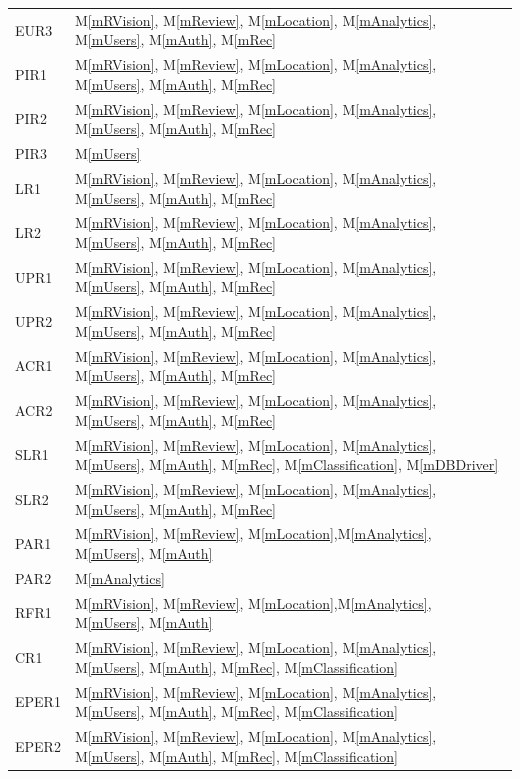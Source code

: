 \documentclass[12pt, titlepage]{article}
\newcommand{\mref}[1]{M\ref{#1}}
\begin{document}
\begin{longtable}{p{} p{}}
EUR3 & \mref{mRVision}, \mref{mReview}, \mref{mLocation}, \mref{mAnalytics}, \mref{mUsers}, \mref{mAuth}, \mref{mRec}\\
PIR1 & \mref{mRVision}, \mref{mReview}, \mref{mLocation}, \mref{mAnalytics}, \mref{mUsers}, \mref{mAuth}, \mref{mRec}\\
PIR2 & \mref{mRVision}, \mref{mReview}, \mref{mLocation}, \mref{mAnalytics}, \mref{mUsers}, \mref{mAuth}, \mref{mRec}\\
PIR3 & \mref{mUsers}\\
LR1 & \mref{mRVision}, \mref{mReview}, \mref{mLocation}, \mref{mAnalytics}, \mref{mUsers}, \mref{mAuth}, \mref{mRec}\\
LR2 & \mref{mRVision}, \mref{mReview}, \mref{mLocation}, \mref{mAnalytics}, \mref{mUsers}, \mref{mAuth}, \mref{mRec}\\
UPR1 & \mref{mRVision}, \mref{mReview}, \mref{mLocation}, \mref{mAnalytics}, \mref{mUsers}, \mref{mAuth}, \mref{mRec}\\
UPR2 & \mref{mRVision}, \mref{mReview}, \mref{mLocation}, \mref{mAnalytics}, \mref{mUsers}, \mref{mAuth}, \mref{mRec}\\
ACR1 & \mref{mRVision}, \mref{mReview}, \mref{mLocation}, \mref{mAnalytics}, \mref{mUsers}, \mref{mAuth}, \mref{mRec}\\
ACR2 & \mref{mRVision}, \mref{mReview}, \mref{mLocation}, \mref{mAnalytics}, \mref{mUsers}, \mref{mAuth}, \mref{mRec}\\
SLR1 & \mref{mRVision}, \mref{mReview}, \mref{mLocation}, \mref{mAnalytics}, \mref{mUsers}, \mref{mAuth}, \mref{mRec}, \mref{mClassification}, \mref{mDBDriver}\\
SLR2 & \mref{mRVision}, \mref{mReview}, \mref{mLocation}, \mref{mAnalytics}, \mref{mUsers}, \mref{mAuth}, \mref{mRec}\\
PAR1 & \mref{mRVision}, \mref{mReview}, \mref{mLocation},\mref{mAnalytics}, \mref{mUsers}, \mref{mAuth}\\
PAR2 & \mref{mAnalytics}\\
RFR1 & \mref{mRVision}, \mref{mReview}, \mref{mLocation},\mref{mAnalytics}, \mref{mUsers}, \mref{mAuth}\\
CR1 & \mref{mRVision}, \mref{mReview}, \mref{mLocation}, \mref{mAnalytics}, \mref{mUsers}, \mref{mAuth}, \mref{mRec}, \mref{mClassification}\\
EPER1 & \mref{mRVision}, \mref{mReview}, \mref{mLocation}, \mref{mAnalytics}, \mref{mUsers}, \mref{mAuth}, \mref{mRec}, \mref{mClassification}\\
EPER2 & \mref{mRVision}, \mref{mReview}, \mref{mLocation}, \mref{mAnalytics}, \mref{mUsers}, \mref{mAuth}, \mref{mRec}, \mref{mClassification}\\

\end{longtable}
\end{document}
